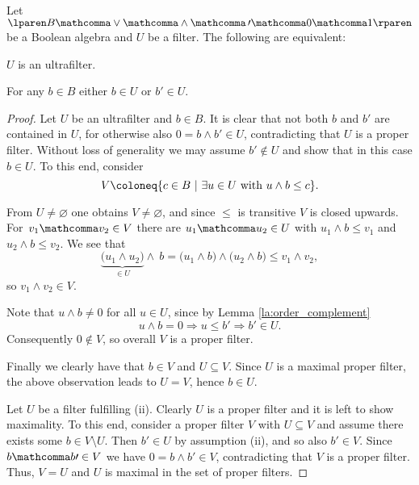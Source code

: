 \begin{proposition}
\label{prop:ultrafilter}
  Let
  $\lparen B \mathcomma \vee \mathcomma \wedge \mathcomma \, \prime
  \mathcomma 0 \mathcomma 1 \rparen$
  be a Boolean algebra and $U$ be a filter.
  The following are equivalent:
  \begin{enumroman}
    \item $U$ is an ultrafilter.
    \item For any $b \in B$ either $b \in U$ or $b \prime \in U$.
  \end{enumroman}
\end{proposition}

\begin{proof}
  \fbox{$\Rightarrow$}
  Let $U$ be an ultrafilter and $b \in B$.
  It is clear that not both $b$ and $b \prime$ are contained in $U$,
  for otherwise also $0 \equal b \wedge b \prime \in U$,
  contradicting that $U$ is a proper filter.
  Without loss of generality we may assume $b \prime \notin U$
  and show that in this case $b \in U$.
  To this end, consider
  \[
    V
    \coloneq
    \lbrace
    c \in B \pipe \exists u \in U \text{ with } u \wedge b \leq c
    \rbrace.
  \]

  From $U \ne \varnothing$ one obtains $V \ne \varnothing$,
  and since $\leq$ is transitive $V$ is closed upwards.
  For~$v_1 \mathcomma v_2 \in V$ there are $u_1 \mathcomma u_2 \in U$
  with $u_1 \wedge b \leq v_1$ and $u_2 \wedge b \leq v_2$.
  We see that
  \[
    \underbrace{ \lparen u_1 \wedge u_2 \rparen }_{ \in U } \wedge \: b
    \equal
    \lparen u_1 \wedge b \rparen \wedge \lparen u_2 \wedge b \rparen
    \leq
    v_1 \wedge v_2,
  \]
  so $v_1 \wedge v_2 \in V$.

  Note that $u \wedge b \ne 0$ for all $u \in U$,
  since by Lemma \ref{la:order_complement}
  \[
    u \wedge b \equal 0
    \Rightarrow
    u \leq b \prime
    \Rightarrow
    b \prime \in U.
  \]
  Consequently $0 \notin V$,
  so overall $V$ is a proper filter.

  Finally we clearly have that $b \in V$ and $U \subseteq V$.
  Since $U$ is a maximal proper filter,
  the above observation leads to $U \equal V$,
  hence $b \in U$.

  \fbox{$\Leftarrow$}
  Let $U$ be a filter fulfilling (ii).
  Clearly $U$ is a proper filter and it is left to show maximality.
  To this end, consider a proper filter $V$ with $U \subseteq V$
  and assume there exists some $b \in V \setminus U$.
  Then $b \prime \in U$ by assumption (ii),
  and so also $b \prime \in V$.
  Since $b \mathcomma b \prime \in V$
  we have $0 \equal b \wedge b \prime \in V$,
  contradicting that $V$ is a proper filter.
  Thus, $V \equal U$ and $U$ is maximal in the set of proper filters.
\end{proof}

